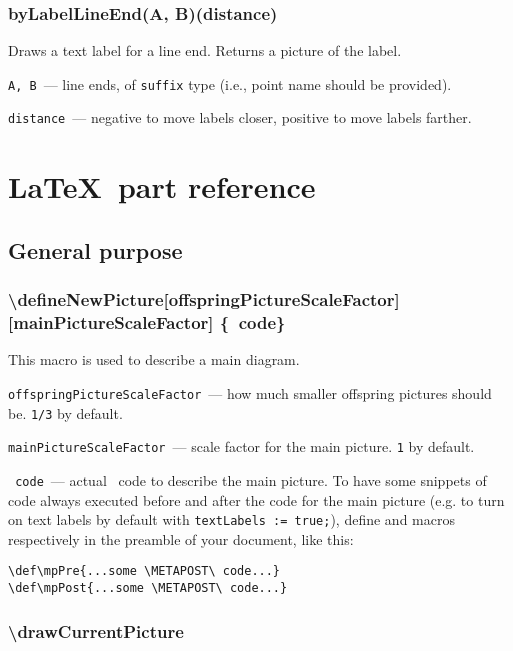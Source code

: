 \subsubsection{byLabelLineEnd(A, B)(distance)}\label{byLabelLineEnd}
	
	Draws a text label for a line end. Returns a picture of the label.
	
	\texttt{A, B}~— line ends, of \texttt{suffix} type (i.e., point name should be provided).
	
	\texttt{distance}~— negative to move labels closer, positive to move labels farther.


\section{\LaTeX\ part reference}

\subsection{General purpose}

\subsubsection{\textbackslash defineNewPicture[offspringPictureScaleFactor] [mainPictureScaleFactor] \{\METAPOST\ code\}}\label{defineNewPicture}

	This macro is used to describe a main diagram.

	\texttt{offspringPictureScaleFactor}~— how much smaller offspring pictures should be. \texttt{1/3} by default.
	
	\texttt{mainPictureScaleFactor}~— scale factor for the main picture. \texttt{1} by default.
	
	\texttt{\METAPOST\ code}~— actual \METAPOST\ code to describe the main picture. To have some snippets of code always executed before and after the code for the main picture (e.g. to turn on text labels by default with \texttt{textLabels := true;}), define  and  macros respectively in the preamble of your document, like this:
	
\begin{lstlisting}
\def\mpPre{...some \METAPOST\ code...}
\def\mpPost{...some \METAPOST\ code...}
\end{lstlisting}


\subsubsection{\textbackslash drawCurrentPicture}
	
